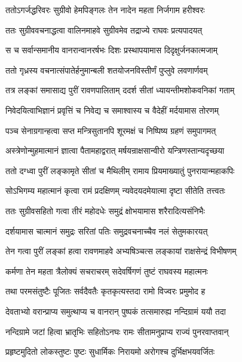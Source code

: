 \twolineshloka
{ततोऽगर्जद्धरिवरः सुग्रीवो हेमपिङ्गलः}
{तेन नादेन महता निर्जगाम हरीश्वरः} %

\twolineshloka
{ततः सुग्रीववचनाद्धत्वा वालिनमाहवे}
{सुग्रीवमेव तद्राज्ये राघवः प्रत्यपादयत्} %

\twolineshloka
{स च सर्वान्समानीय वानरान्वानरर्षभः}
{दिशः प्रस्थापयामास दिदृक्षुर्जनकात्मजाम्} %

\twolineshloka
{ततो गृध्रस्य वचनात्संपातेर्हनुमान्बली}
{शतयोजनविस्तीर्णं पुप्लुवे लवणार्णवम्} %

\twolineshloka
{तत्र लङ्कां समासाद्य पुरीं रावणपालिताम्}
{ददर्श सीतां ध्यायन्तीमशोकवनिकां गताम्} %

\twolineshloka
{निवेदयित्वाभिज्ञानं प्रवृत्तिं च निवेद्य च}
{समाश्वास्य च वैदेहीं मर्दयामास तोरणम्} %

\twolineshloka
{पञ्च सेनाग्रगान्हत्वा सप्त मन्त्रिसुतानपि}
{शूरमक्षं च निष्पिष्य ग्रहणं समुपागमत्} %

\twolineshloka
{अस्त्रेणोन्मुहमात्मानं ज्ञात्वा पैतामहाद्वरात्}
{मर्षयन्राक्षसान्वीरो यन्त्रिणस्तान्यदृच्छया} %

\twolineshloka
{ततो दग्ध्वा पुरीं लङ्कामृते सीतां च मैथिलीम्}
{रामाय प्रियमाख्यातुं पुनरायान्महाकपिः} %

\twolineshloka
{सोऽभिगम्य महात्मानं कृत्वा रामं प्रदक्षिणम्}
{न्यवेदयदमेयात्मा दृष्टा सीतेति तत्त्वतः} %

\twolineshloka
{ततः सुग्रीवसहितो गत्वा तीरं महोदधेः}
{समुद्रं क्षोभयामास शरैरादित्यसंनिभैः} %

\twolineshloka
{दर्शयामास चात्मानं समुद्रः सरितां पतिः}
{समुद्रवचनाच्चैव नलं सेतुमकारयत्} %

\twolineshloka
{तेन गत्वा पुरीं लङ्कां हत्वा रावणमाहवे}
{अभ्यषिञ्चत्स लङ्कायां राक्षसेन्द्रं विभीषणम्} %

\twolineshloka
{कर्मणा तेन महता त्रैलोक्यं सचराचरम्}
{सदेवर्षिगणं तुष्टं राघवस्य महात्मनः} %

\twolineshloka
{तथा परमसंतुष्टैः पूजितः सर्वदैवतैः}
{कृतकृत्यस्तदा रामो विज्वरः प्रमुमोद ह} %

\twolineshloka
{देवताभ्यो वरान्प्राप्य समुत्थाप्य च वानरान्}
{पुष्पकं तत्समारुह्य नन्दिग्रामं ययौ तदा} %

\twolineshloka
{नन्दिग्रामे जटां हित्वा भ्रातृभिः सहितोऽनघः}
{रामः सीतामनुप्राप्य राज्यं पुनरवाप्तवान्} %

\twolineshloka
{प्रहृष्टमुदितो लोकस्तुष्टः पुष्टः सुधार्मिकः}
{निरायमो अरोगश्च दुर्भिक्षभयवर्जितः} %

